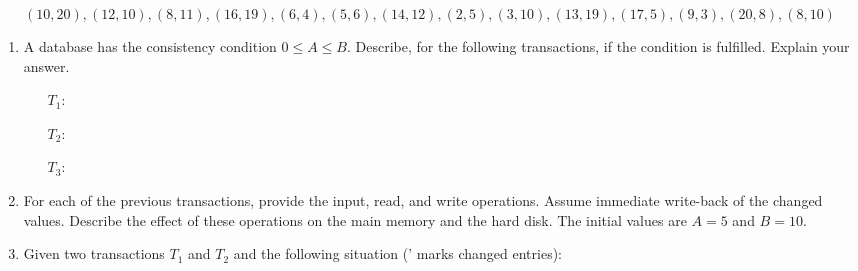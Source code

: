 $$(10,20),(12,10),(8,11),(16,19),(6,4),(5,6),(14,12),(2,5),(3,10),(13,19),(17,5),(9,3),(20,8),(8,10)$$

\newpage


\begin{enumerate}
	\item A database has the consistency condition $0\leq A\leq B$. Describe, for the following transactions, if the condition is fulfilled. Explain your answer.

    \begin{enumerate}

    \item[$T_1: $] 
    \item[$T_2: $] 
    \item[$T_3: $] 
    \end{enumerate}

\item For each of the previous transactions, provide the input, read, and write operations. Assume immediate write-back of the changed values. Describe the effect of these operations on the main memory and the hard disk. The initial values are $A=5$ and $B=10$.

\item Given two transactions $T_1$ and $T_2$ and the following situation (' marks changed entries):

 \begin{center}

\end{center}
\end{enumerate}
